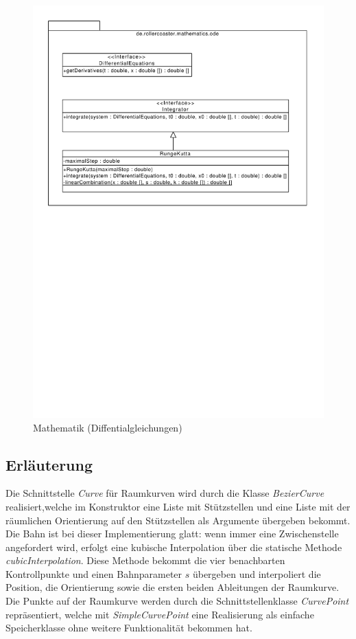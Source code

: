 \begin{figure}
\includegraphics[width=\linewidth]{bilder/Mathematics_ODE}
\caption{Mathematik (Diffentialgleichungen)}
\label{fig:ode}
\end{figure}

\subsection{Erläuterung}
Die Schnittstelle \emph{Curve} für Raumkurven wird durch die Klasse \emph{BezierCurve} 
realisiert,welche im Konstruktor eine Liste mit Stützstellen und eine Liste mit der
räumlichen Orientierung auf den Stützstellen als Argumente übergeben bekommt. Die Bahn
ist bei dieser Implementierung glatt: wenn immer eine Zwischenstelle angefordert wird,
erfolgt eine kubische Interpolation über die statische Methode \emph{cubicInterpolation}.
Diese Methode bekommt die vier benachbarten Kontrollpunkte und einen Bahnparameter $s$
übergeben und interpoliert die Position, die Orientierung sowie die ersten beiden 
Ableitungen der Raumkurve. 
Die Punkte auf der Raumkurve werden durch die Schnittstellenklasse \emph{CurvePoint}
repräsentiert, welche mit \emph{SimpleCurvePoint} eine Realisierung als einfache
Speicherklasse ohne weitere Funktionalität bekommen hat.

